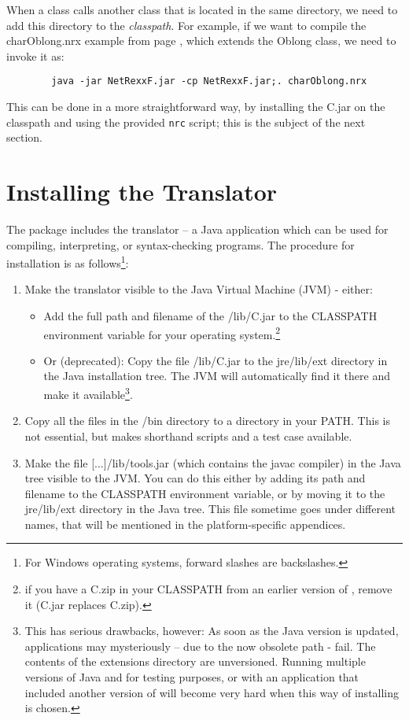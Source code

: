 When a class calls another class that is located in the same
directory, we need to add this directory to the \emph{classpath}. For
example, if we want to compile the charOblong.nrx example from page
\pageref{charoblong}, which extends the Oblong class, we need to
invoke it as:
 \begin{lstlisting}
        java -jar NetRexxF.jar -cp NetRexxF.jar;. charOblong.nrx
\end{lstlisting}
This can be done in a more straightforward way, by installing the
\nr{}C.jar on the classpath and using the provided \texttt{nrc}
script; this is the subject of the next section.

\section{Installing the \nr{} Translator}
The \nr{} package includes the \nr{} translator – a Java application which can be used for compiling, interpreting, or syntax-checking \nr{} programs. The procedure for installation is as follows\footnote{For Windows operating systems, forward slashes are backslashes.}:
\begin{enumerate}
\item Make the translator visible to the Java Virtual Machine (JVM) - either:
\begin{itemize} 
\item Add the full path and filename of the \nr{}/lib/\nr{}C.jar to the CLASSPATH environment variable for your operating system.\footnote{if you have a \nr{}C.zip in your CLASSPATH from an earlier version of \nr{}, remove it (\nr{}C.jar replaces \nr{}C.zip).}
\item Or (deprecated): Copy the file \nr{}/lib/\nr{}C.jar to the jre/lib/ext directory in the Java installation tree. The JVM will automatically find it there and make it available\footnote{ This has serious drawbacks, however:
As soon as the Java version is updated, \nr{} applications may
mysteriously – due to the now obsolete path - fail. The contents of
the extensions directory are unversioned.
Running multiple versions of Java and \nr{} for testing purposes, or
with an application that included another version of \nr{} will become very hard when this way of installing is chosen.}.
\end{itemize}
\item Copy all the files in the \nr{}/bin directory to a directory in your PATH. This is not essential, but makes shorthand scripts and a test case available. 
\item Make the file [...]/lib/tools.jar (which contains the javac compiler) in the Java tree visible to the JVM. You can do this either by adding its path and filename to the CLASSPATH environment variable, or by moving it to the jre/lib/ext directory in the Java tree. This file sometime goes under different names, that will be mentioned in the platform-specific appendices.
\end{enumerate}
